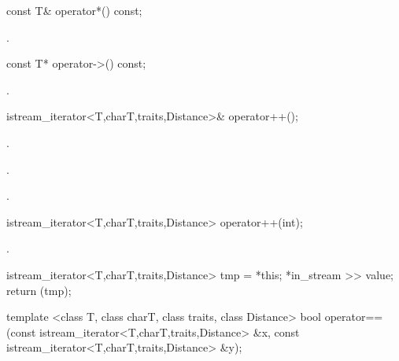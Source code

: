 %
%
\begin{itemdecl}
const T& operator*() const;
\end{itemdecl}

\begin{itemdescr}
\pnum
\returns
{}.
\end{itemdescr}

%
%
\begin{itemdecl}
const T* operator->() const;
\end{itemdecl}

\begin{itemdescr}
\pnum
\returns
{}.
\end{itemdescr}

%
%
\begin{itemdecl}
istream_iterator<T,charT,traits,Distance>& operator++();
\end{itemdecl}

\begin{itemdescr}
\pnum
\requires {}.

\pnum
\effects
{}.

\pnum
\returns
{}.
\end{itemdescr}

%
%
\begin{itemdecl}
istream_iterator<T,charT,traits,Distance> operator++(int);
\end{itemdecl}

\begin{itemdescr}
\pnum
\requires {}.

\pnum
\effects
\begin{codeblock}
istream_iterator<T,charT,traits,Distance> tmp = *this;
*in_stream >> value;
return (tmp);
\end{codeblock}
\end{itemdescr}

%
%
\begin{itemdecl}
template <class T, class charT, class traits, class Distance>
  bool operator==(const istream_iterator<T,charT,traits,Distance> &x,
                  const istream_iterator<T,charT,traits,Distance> &y);
\end{itemdecl}

